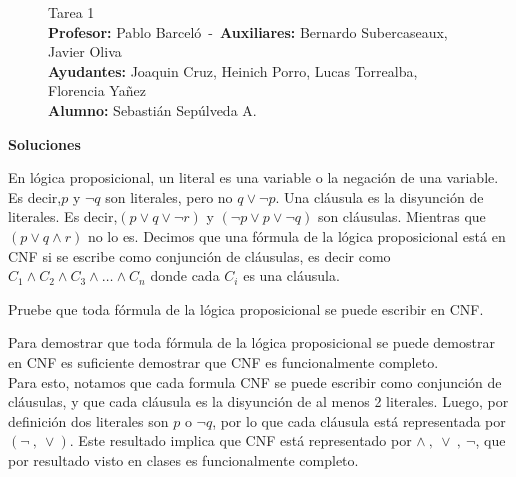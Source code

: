 \documentclass[letterpaper,10pt]{article}
\begin{document}
\pagestyle{style2}
\begin{figure}
\centering
\begin{minipage}[c]{0.8\textwidth}
\centering
\vspace{0.3cm}
{\Large Tarea 1}
\vspace{0.3cm}\\
\textbf{Profesor:} Pablo Barceló\ -\ \textbf{Auxiliares:} Bernardo Subercaseaux, Javier Oliva\\
\textbf{Ayudantes:} Joaquin Cruz, Heinich Porro, Lucas Torrealba, Florencia Yañez\\
\textbf{Alumno:} Sebastián Sepúlveda A.
\end{minipage}
\end{figure}

\textbf{{\Large Soluciones}}
\\

\begin{tcolorbox}[colback=red!5!white,colframe=red!75!black]
 En lógica proposicional, un literal es una variable o la negación de una variable. Es decir,$p$ y $\neg q$ son literales, pero no $q \vee  \neg p$. Una cláusula es la disyunción de literales. Es decir,$(p \vee  q\vee \neg r)$ y $(\neg p \vee  p \vee  \neg q)$ son cláusulas. Mientras que $(p \vee  q \wedge r)$ no lo es. Decimos que una fórmula de la lógica proposicional está en CNF si se escribe como conjunción de cláusulas, es decir como $C_1 \wedge C_2 \wedge C_3 \wedge \ldots \wedge C_n$ donde cada $C_i$ es una cláusula.
\end{tcolorbox}

\begin{tcolorbox}
 Pruebe que toda fórmula de la lógica proposicional se puede escribir en CNF.
\end{tcolorbox}

Para demostrar que toda fórmula de la lógica proposicional se puede demostrar en CNF es suficiente demostrar que CNF es funcionalmente completo. 
\\

Para esto, notamos que cada formula CNF se puede escribir como conjunción de cláusulas, y que cada cláusula es la disyunción de al menos 2 literales. Luego, por definición dos literales son 
$p$ o $\neg q$, por lo que cada cláusula está representada por $(\neg\ ,\ \vee)$. Este resultado implica que CNF está representado por $\wedge\ ,\ \vee\ ,\ \neg $, que por resultado visto en clases es funcionalmente completo.
\\
\end{document}
